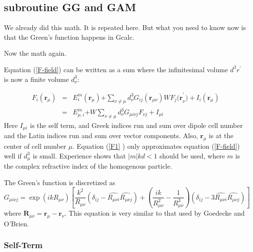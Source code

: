 \documentclass{article}
\begin{document}
\subsection{subroutine GG and GAM}

We already did this math. It is repeated here. But what you need to know now
is that the Green's function happens in Gcalc.

Now the math again.

Equation (\ref{F-field}) can be written as a sum where the infinitesimal
volume $d^{3}r^{\prime }$ is now a finite volume $d_{\nu }^{3}$:

\begin{eqnarray}
F_{i}(\mathbf{r}_{\mu }) &=&E_{i}^{in}\left( \mathbf{r}_{\mu }\right) 
\mathbf{+}\sum\limits_{\nu \neq \mu }d_{\nu }^{3}G_{ij}\left( \mathbf{r}%
_{\mu \nu }\right) WF_{j}\mathbf{(r}_{\nu }^{\prime })+I_{i}(\mathbf{r}_{\mu
})  \label{F1} \\
&=&E_{\mu ,i}^{in}\mathbf{+}W\sum\limits_{\nu \neq \mu }d_{\nu }^{3}G_{\mu
i\nu j}F_{\nu j}+I_{\mu i}  \nonumber
\end{eqnarray}
Here $I_{\mu i}$ is the self term, and Greek indices run and sum over dipole
cell number and the Latin indices run and sum over vector components. Also, $%
\mathbf{r}_{\mu }$ is at the center of cell number $\mu .$ Equation (\ref{F1}%
) only approximates equation (\ref{F-field}) well if $d_{\mu }^{3}$ is
small. Experience shows that $\left| m\right| kd<1$ should be used, where $m$
is the complex refractive index of the homogenous particle.

The Green's function is discretized as 
\begin{equation}
G_{\mu i\nu j}=\exp (ikR_{\mu \nu })\left[ \frac{k^{2}}{R_{\mu \nu }}\left(
\delta _{ij}-\widehat{R_{\mu \nu i}}\widehat{R_{\mu \nu j}}\right) +\left( 
\frac{ik}{R_{\mu \nu }^{2}}-\frac{1}{R_{\mu \nu }^{3}}\right) \left( \delta
_{ij}-3\widehat{R_{\mu \nu i}}\widehat{R_{\mu \nu j}}\right) \right]
\end{equation}
where $\mathbf{R}_{\mu \nu }=\mathbf{r}_{\mu }-\mathbf{r}_{\nu }.$ This
equation is very similar to that used by Goedecke and O'Brien.\cite%
{Goedecke88}

\subsubsection{Self-Term}
\end{document}
